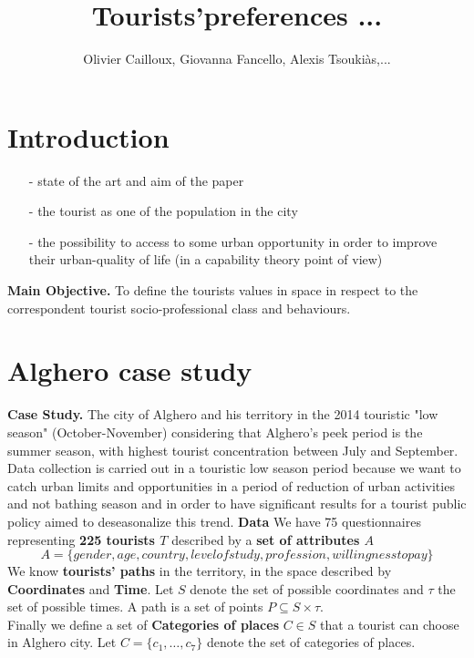 \documentclass[version=last, pagesize, twoside=semi, DIV=calc, 12pt, a4paper, french, english]{scrartcl}
\begin{document}
\title{Tourists'preferences ...}
\author{Olivier Cailloux, Giovanna Fancello, Alexis Tsoukiàs,...}
\makeatletter
\makeatother
\maketitle

\tableofcontents

\section{Introduction}
\begin{itemize}
   \item [-]state of the art and aim of the paper
   \item [-]the tourist as one of the population in the city
   \item [-]the possibility to access to some urban opportunity in order to improve their urban-quality of life (in a capability theory point of view)
 \end{itemize}
\textbf{Main Objective.}
To define the tourists values in space in respect to the correspondent tourist socio-professional class and behaviours.

\section{Alghero case study}

\textbf{Case Study.}
The city of Alghero and his territory in the 2014 touristic "low season" (October-November) considering that Alghero's peek period is the summer season, with highest tourist concentration between July and September. Data collection is carried out in a touristic low season period because we want to catch urban limits and opportunities in a period of reduction of urban activities and not bathing season and in order to have significant results for a tourist public policy aimed to deseasonalize this trend.
\textbf{Data}
We have 75 questionnaires representing \textbf{225 tourists $T$} described by a \textbf{set of attributes $A$}
\begin{equation}
A=\{gender,age,country,level of study,profession,willingness to pay\}
\end{equation}
We know \textbf{tourists' paths} in the territory, in the space described by \textbf{Coordinates} and \textbf{Time}.
Let $S$ denote the set of possible coordinates and $\tau$ the set of possible times.  A path is a set of points $P \subseteq S \times \tau$.\\
Finally we define a set of \textbf{Categories of places} $C \in S$ that a tourist can choose in Alghero city.
Let $C=\{c_1, \ldots, c_7\}$ denote the set of categories of places.
\end{document}
